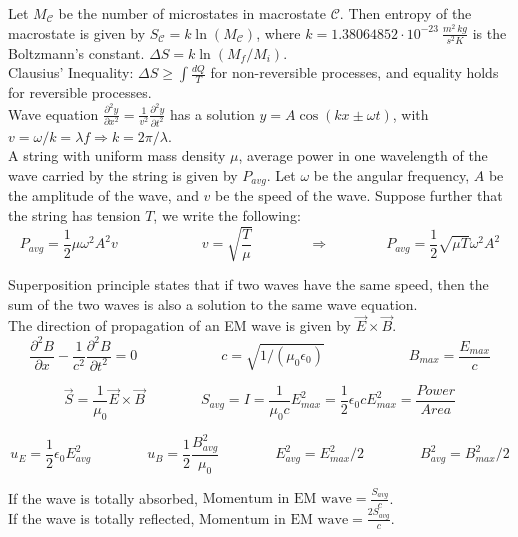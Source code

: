 \documentclass[10pt]{article}
\theoremstyle{break}
\theoremstyle{break}
\newcommand{\C}{\mathcal{C}}
\begin{document}
Let $M_{\C}$ be the number of microstates in macrostate $\C$. Then entropy of the macrostate is given by $S_{\C} = k\ln(M_{\C})$, where $k = 1.38064852\cdot 10^{-23}\ \frac{m^2\, kg}{s^2 K}$ is the Boltzmann's constant. $\Delta S = k\ln (M_f/M_i)$. \\

Clausius' Inequality: $\Delta S \geq \int \frac{dQ}{T}$ for non-reversible processes, and equality holds for reversible processes.\\

Wave equation $\frac{\partial^2 y}{\partial x^2}= \frac{1}{v^2} \frac{\partial^2 y}{\partial t^2}$ has a solution $y = A\cos(kx\pm \omega t)$, with $v = \omega / k = \lambda f \Rightarrow k=2\pi/\lambda$.\\

A string with uniform mass density $\mu$, average power in one wavelength of the wave carried by the string is given by $P_{avg}$. Let $\omega$ be the angular frequency, $A$ be the amplitude of the wave, and $v$ be
the speed of the wave. Suppose further that the string has tension $T$, we write the following:
$$P_{avg} = \frac{1}{2}\mu \omega^2 A^2 v\qquad\qquad \qquad v = \sqrt{\frac{T}{\mu}}\qquad\qquad\Rightarrow\qquad \qquad P_{avg} = \frac{1}{2}\sqrt{\mu T}\omega^2 A^2$$

Superposition principle states that if two waves have the same speed, then the sum of the two waves is also a solution to the same wave equation. \\

The direction of propagation of an EM wave is given by $\vec{E}\times \vec{B}$. \\
$$\frac{\partial^2 B}{\partial x} - \frac{1}{c^2}\frac{\partial^2 B}{\partial t^2} = 0\qquad\qquad\qquad  c = \sqrt{1/(\mu_0 \epsilon_0)}\qquad\qquad\qquad B_{max}=\frac{E_{max}}{c}$$

$$\vec{S} = \frac{1}{\mu_0}\vec{E}\times \vec{B}\qquad\qquad S_{avg} = I = \frac{1}{\mu_0 c}E_{max}^2=\frac{1}{2}\epsilon_0 c E_{max}^2 = \frac{Power}{Area}$$

$$u_E = \frac{1}{2}\epsilon_0 E_{avg}^2 \qquad\qquad u_B = \frac{1}{2}\frac{B_{avg}^2}{\mu_0}\qquad\qquad E_{avg}^2 = E_{max}^2/2\qquad\qquad B_{avg}^2 = B_{max}^2/2$$

If the wave is totally absorbed, $\text{Momentum in EM wave} = \frac{S_{avg}}{c}$. \\If the wave is totally reflected, $\text{Momentum in EM wave} = \frac{2S_{avg}}{c}$.\\
\end{document}
